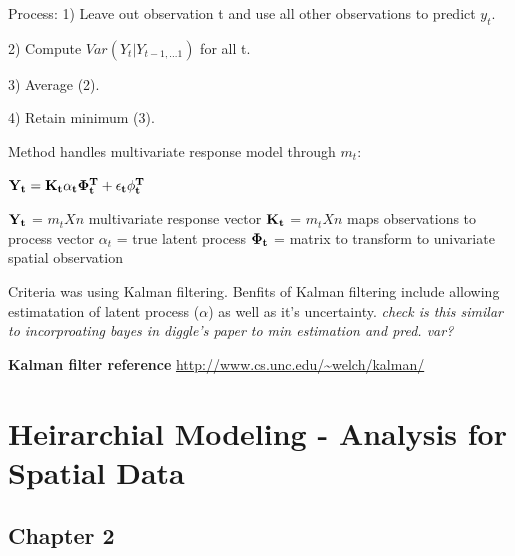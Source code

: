 \documentclass[a4paper]{article}\usepackage[]{graphicx}\usepackage[]{color}
\begin{document}
Process:
1) Leave out observation t and use all other observations to predict $y_{t}$. 

2) Compute $Var(Y_{t} | Y_{t-1,...1})$ for all t.

3) Average (2).

4) Retain minimum (3).

Method handles multivariate response model through $m_{t}$:

\begin{center}
${\bf Y_{t}} = {\bf K_{t}\alpha_{t}\Phi_{t}^{T}} + {\bf \epsilon_{t}\phi_{t}^{T}}$
\end{center}

${\bf Y_{t}}$ = $m_{t} X n$ multivariate response vector
${\bf K_{t}}$ = $m_{t} X n$ maps observations to process vector
{\bf $\alpha_{t}$} = true latent process
${\bf \Phi_{t}}$ = matrix to transform to univariate spatial observation

Criteria was using Kalman filtering. Benfits of Kalman filtering include allowing estimatation of latent process ({\bf $\alpha$}) as well as it's uncertainty. {\it check is this similar to incorproating bayes in diggle's paper to min estimation and pred. var?}

\vspace{1in}

{\bf Kalman filter reference} \url{http://www.cs.unc.edu/~welch/kalman/}

\section*{Heirarchial Modeling - Analysis for Spatial Data}

\subsection*{Chapter 2}
\end{document}
